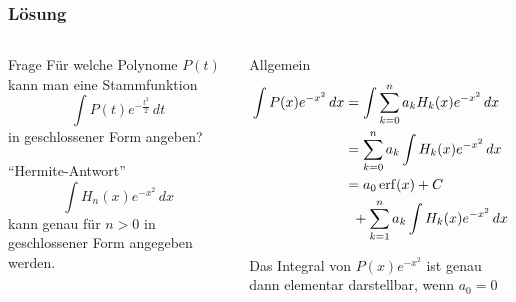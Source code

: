 %
%
%
\bgroup
\begin{frame}[t]
\setlength{\abovedisplayskip}{5pt}
\setlength{\belowdisplayskip}{5pt}
\frametitle{Lösung}
\vspace{-20pt}
\begin{columns}[t,onlytextwidth]
\begin{column}{0.48\textwidth}
\begin{block}{Frage}
Für welche Polynome $P(t)$ kann man eine Stammfunktion
\[
\int
P(t)e^{-\frac{t^2}2}
\,dt
\]
in geschlossener Form angeben?
\end{block}
\begin{block}{``Hermite-Antwort''}
\[
\int H_n(x)e^{-x^2}\,dx
\]
kann genau für $n>0$ in geschlossener Form angegeben werden.
\end{block}
\end{column}
\begin{column}{0.48\textwidth}
\begin{block}{Allgemein}
\begin{align*}
\int P(x)e^{-x^2}\,dx
&=
\int \sum_{k=0}^n a_kH_k(x)e^{-x^2}\,dx
\\
&=
\sum_{k=0}^n
a_k
\int
H_k(x)e^{-x^2}\,dx
\\
&=
a_0\operatorname{erf}(x) + C
\\
&\hspace*{2mm} + \sum_{k=1}^n a_k\int H_k(x)e^{-x^2}\,dx
\end{align*}
\end{block}
\begin{theorem}
Das Integral von $P(x)e^{-x^2}$ ist genau dann elementar darstellbar, wenn
$a_0=0$
\end{theorem}
\end{column}
\end{columns}
\end{frame}
\egroup
